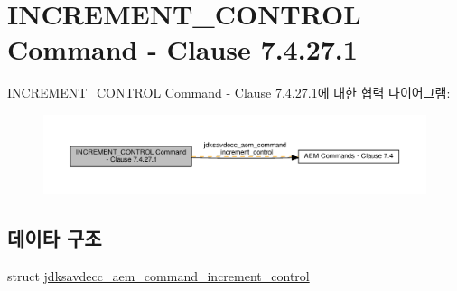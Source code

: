 \hypertarget{group__command__increment__control}{}\section{I\+N\+C\+R\+E\+M\+E\+N\+T\+\_\+\+C\+O\+N\+T\+R\+OL Command -\/ Clause 7.4.27.1}
\label{group__command__increment__control}
I\+N\+C\+R\+E\+M\+E\+N\+T\+\_\+\+C\+O\+N\+T\+R\+OL Command -\/ Clause 7.4.27.1에 대한 협력 다이어그램\+:
\nopagebreak
\begin{figure}[H]
\begin{center}
\leavevmode
\includegraphics[width=350pt]{group__command__increment__control}
\end{center}
\end{figure}
\subsection*{데이타 구조}
\begin{DoxyCompactItemize}
\item 
struct \hyperlink{structjdksavdecc__aem__command__increment__control}{jdksavdecc\+\_\+aem\+\_\+command\+\_\+increment\+\_\+control}
\end{DoxyCompactItemize}
